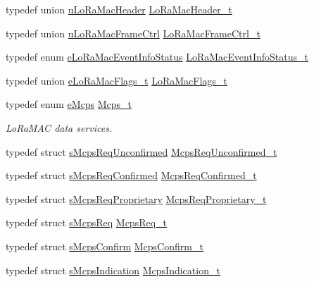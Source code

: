 \begin{DoxyCompactItemize}
\item 
typedef union \hyperlink{unionuLoRaMacHeader}{u\+Lo\+Ra\+Mac\+Header} \hyperlink{group__LORAMAC_gaff5f7004a7a48d53d858e26834b53efa}{Lo\+Ra\+Mac\+Header\+\_\+t}
\item 
typedef union \hyperlink{unionuLoRaMacFrameCtrl}{u\+Lo\+Ra\+Mac\+Frame\+Ctrl} \hyperlink{group__LORAMAC_ga12b0f3e7e6edd26cfdb9d10a1d873ab7}{Lo\+Ra\+Mac\+Frame\+Ctrl\+\_\+t}
\item 
typedef enum \hyperlink{group__LORAMAC_ga3c4e7a774e25faf1606f577ee5e7d201}{e\+Lo\+Ra\+Mac\+Event\+Info\+Status} \hyperlink{group__LORAMAC_gac6ffc346a4c767f7a743c87a686c51b4}{Lo\+Ra\+Mac\+Event\+Info\+Status\+\_\+t}
\item 
typedef union \hyperlink{unioneLoRaMacFlags__t}{e\+Lo\+Ra\+Mac\+Flags\+\_\+t} \hyperlink{group__LORAMAC_ga4044e22ced14e9517d7a21663c577c30}{Lo\+Ra\+Mac\+Flags\+\_\+t}
\item 
typedef enum \hyperlink{group__LORAMAC_ga7b080a046606f23fe030d0aa6d2a0e30}{e\+Mcps} \hyperlink{group__LORAMAC_ga670d0c87a52aeb13391f303a4cf94f00}{Mcps\+\_\+t}
\begin{DoxyCompactList}\small\item\em Lo\+Ra\+M\+AC data services. \end{DoxyCompactList}\item 
typedef struct \hyperlink{structsMcpsReqUnconfirmed}{s\+Mcps\+Req\+Unconfirmed} \hyperlink{group__LORAMAC_gaab871b914dfa4013c176586dcc2ea6df}{Mcps\+Req\+Unconfirmed\+\_\+t}
\item 
typedef struct \hyperlink{structsMcpsReqConfirmed}{s\+Mcps\+Req\+Confirmed} \hyperlink{group__LORAMAC_ga02103c0ee1374a6b1eec217f148ec0e2}{Mcps\+Req\+Confirmed\+\_\+t}
\item 
typedef struct \hyperlink{structsMcpsReqProprietary}{s\+Mcps\+Req\+Proprietary} \hyperlink{group__LORAMAC_gac856bc282e89301412e0a294b3e663c4}{Mcps\+Req\+Proprietary\+\_\+t}
\item 
typedef struct \hyperlink{structsMcpsReq}{s\+Mcps\+Req} \hyperlink{group__LORAMAC_ga038e0fe5eecc1fc4e8165eace8e2e683}{Mcps\+Req\+\_\+t}
\item 
typedef struct \hyperlink{structsMcpsConfirm}{s\+Mcps\+Confirm} \hyperlink{group__LORAMAC_ga925536babf8abe83918a19f5ae88bd44}{Mcps\+Confirm\+\_\+t}
\item 
typedef struct \hyperlink{structsMcpsIndication}{s\+Mcps\+Indication} \hyperlink{group__LORAMAC_ga202591b6553d63fae89bd42787496616}{Mcps\+Indication\+\_\+t}
\item 

\end{DoxyCompactItemize}
